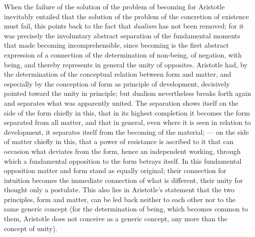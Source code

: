 When the failure of the solution of the problem of becoming for
Aristotle inevitably entailed that the solution of the problem of the
concretion of existence must fail, this points back to the fact that
\emph{dualism} has not been removed; for it was precisely the involuntary
abstract separation of the fundamental moments that made becoming
incomprehensible, since becoming is the first abstract expression of a
connection of the determination of non-being, of negation, with being,
and thereby represents in general the unity of opposites. Aristotle had,
by the determination of the conceptual relation between form and matter,
and especially by the conception of form as principle of development,
decisively pointed toward the unity in principle; but dualism
nevertheless breaks forth again and separates what was apparently united.
The separation shows itself on the side of the form chiefly in this, that
in its highest completion it becomes the form separated from all matter,
and that in general, even where it is seen in relation to development, it
separates itself from the becoming of the material; --- on the side of
matter chiefly in this, that a power of resistance is ascribed to it that
can occasion what deviates from the form, hence an independent working,
through which a fundamental opposition to the form betrays itself. In
this fundamental opposition matter and form stand as equally original;
their connection for intuition becomes the immediate connection of what
is different, their unity for thought only a postulate. This also lies in
Aristotle's statement that the two principles, form and matter, can be
led back neither to each other nor to the same generic concept (for the
determination of being, which becomes common to them, Aristotle does not
conceive as a generic concept, any more than the concept of unity).

